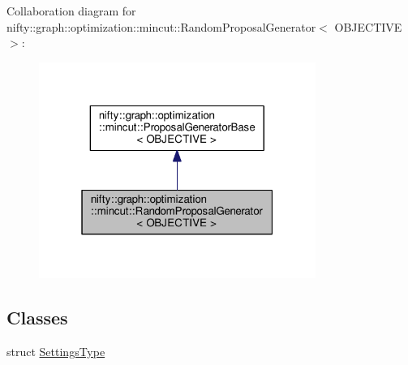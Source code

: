 Collaboration diagram for nifty\+:\+:graph\+:\+:optimization\+:\+:mincut\+:\+:Random\+Proposal\+Generator$<$ O\+B\+J\+E\+C\+T\+I\+V\+E $>$\+:\nopagebreak
\begin{figure}[H]
\begin{center}
\leavevmode
\includegraphics[width=256pt]{classnifty_1_1graph_1_1optimization_1_1mincut_1_1RandomProposalGenerator__coll__graph}
\end{center}
\end{figure}
\subsection*{Classes}
\begin{DoxyCompactItemize}
\item 
struct \hyperlink{structnifty_1_1graph_1_1optimization_1_1mincut_1_1RandomProposalGenerator_1_1SettingsType}{Settings\+Type}
\end{DoxyCompactItemize}

